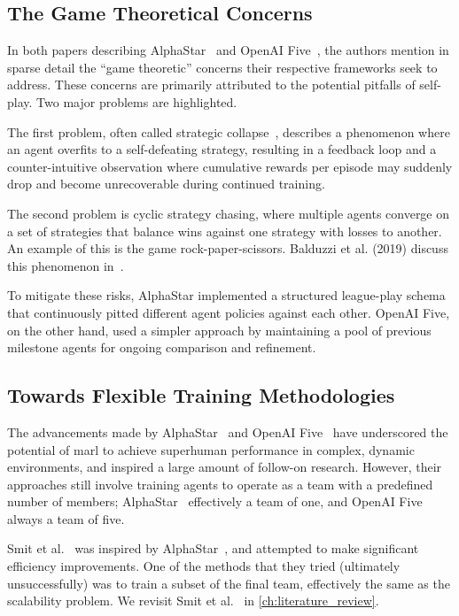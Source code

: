     \subsection*{The Game Theoretical Concerns}%

In both papers describing AlphaStar~\cite{vinyals2019} and OpenAI 
Five~\cite{berner2019}, the authors mention in sparse detail the 
``game theoretic'' concerns their respective frameworks seek to address. 
These concerns are primarily attributed to the potential pitfalls of self-play. 
Two major problems are highlighted.

The first problem, often called strategic 
collapse~\cite{berner2019,vinyals2019}, describes a phenomenon 
where an agent overfits to a self-defeating strategy, 
resulting in a feedback loop and a counter-intuitive observation where 
cumulative rewards per episode may suddenly drop and become unrecoverable 
during continued training.

The second problem is cyclic strategy chasing, where multiple agents 
converge on a set of strategies that balance wins against one strategy 
with losses to another. An example of this is the game rock-paper-scissors. 
Balduzzi et al. (2019) discuss this phenomenon in~\cite{balduzzi2019}.

To mitigate these risks, AlphaStar implemented a structured league-play 
schema that continuously pitted different agent policies against each other. 
OpenAI Five, on the other hand, used a simpler approach by maintaining a pool
of previous milestone agents for ongoing comparison and refinement.


    \subsection*{Towards Flexible Training Methodologies}

The advancements made by AlphaStar~\cite{vinyals2019} and 
OpenAI Five~\cite{berner2019} have underscored the potential of \gls{marl}
to achieve superhuman performance in complex, dynamic environments,
and inspired a large amount of follow-on research.
However, their approaches still involve training agents to 
operate as a team with a predefined number of members;
AlphaStar~\cite{vinyals2019} effectively a team of one,
and OpenAI Five~\cite{berner2019} always a team of five.

Smit et al.~\cite{smit2023} was inspired by AlphaStar~\cite{vinyals2019},
and attempted to make significant efficiency improvements.
One of the methods that they tried (ultimately unsuccessfully) was to train a 
subset of the final team, effectively the same as the scalability problem.
We revisit Smit et al.~\cite{smit2023} in \cref{ch:literature_review}.

